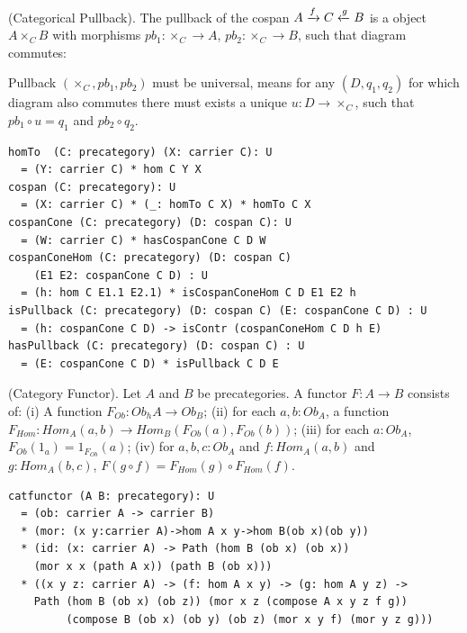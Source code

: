 \begin{definition} (Categorical Pullback).
The pullback of the cospan $A \xrightarrow{{f}} C \xleftarrow{{g}} B$ is a object $A \times_{C} B$ with
morphisms $pb_1 : \times_C \rightarrow A $, $pb_2 : \times_C \rightarrow B$, such that
diagram commutes:
\begin{center}
\end{center}
Pullback $(\times_C,pb_1,pb_2)$ must be universal, means for any $(D,q_1,q_2)$
for which diagram also commutes there must exists a unique $u: D \rightarrow \times_C$,
such that $pb_1 \circ u = q_1$ and $pb_2 \circ q_2$.
\begin{lstlisting}
homTo  (C: precategory) (X: carrier C): U
  = (Y: carrier C) * hom C Y X
cospan (C: precategory): U
  = (X: carrier C) * (_: homTo C X) * homTo C X
cospanCone (C: precategory) (D: cospan C): U
  = (W: carrier C) * hasCospanCone C D W
cospanConeHom (C: precategory) (D: cospan C)
    (E1 E2: cospanCone C D) : U
  = (h: hom C E1.1 E2.1) * isCospanConeHom C D E1 E2 h
isPullback (C: precategory) (D: cospan C) (E: cospanCone C D) : U
  = (h: cospanCone C D) -> isContr (cospanConeHom C D h E)
hasPullback (C: precategory) (D: cospan C) : U
  = (E: cospanCone C D) * isPullback C D E
\end{lstlisting}
\end{definition}

\begin{definition} (Category Functor).
Let $A$ and $B$ be precategories.
A functor $F : A \rightarrow B$ consists of: (i) A function $F_{Ob}: Ob_hA \rightarrow Ob_B$;
(ii) for each $a,b:Ob_A$, a function $F_{Hom}:Hom_A(a,b)\rightarrow Hom_B(F_{Ob}(a),F_{Ob}(b))$;
(iii) for each $a:Ob_A$, $F_{Ob}(1_a) = 1_{F_{Ob}}(a)$;
(iv) for $a,b,c:Ob_A$ and $f: Hom_A(a,b)$ and $g: Hom_A(b,c)$, $F(g\circ f) = F_{Hom}(g)\circ F_{Hom}(f)$.
\begin{lstlisting}
catfunctor (A B: precategory): U
  = (ob: carrier A -> carrier B)
  * (mor: (x y:carrier A)->hom A x y->hom B(ob x)(ob y))
  * (id: (x: carrier A) -> Path (hom B (ob x) (ob x))
    (mor x x (path A x)) (path B (ob x)))
  * ((x y z: carrier A) -> (f: hom A x y) -> (g: hom A y z) ->
    Path (hom B (ob x) (ob z)) (mor x z (compose A x y z f g))
         (compose B (ob x) (ob y) (ob z) (mor x y f) (mor y z g)))
\end{lstlisting}
\end{definition}

